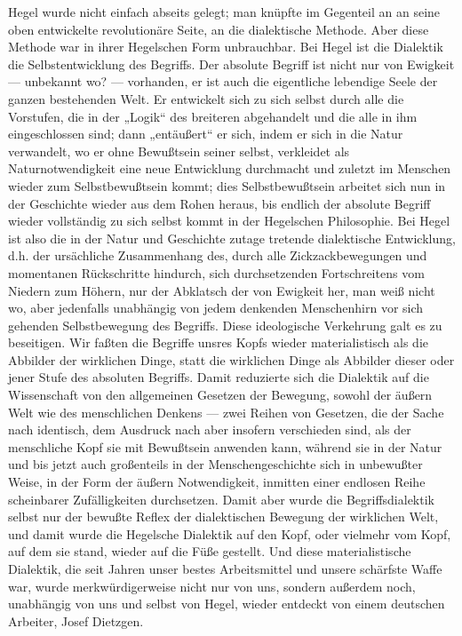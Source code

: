 Hegel wurde nicht einfach abseits gelegt; man knüpfte im
Gegenteil an an seine oben entwickelte revolutionäre Seite, an die
dialektische Methode. Aber diese Methode war in ihrer Hegelschen Form
unbrauchbar. Bei Hegel ist die Dialektik die Selbstentwicklung des
Begriffs. Der absolute Begriff ist nicht nur von Ewigkeit --- unbekannt
wo? --- vorhanden, er ist auch die eigentliche lebendige Seele der ganzen
bestehenden Welt. Er entwickelt sich zu sich selbst durch alle die
Vorstufen, die in der „Logik`` des breiteren abgehandelt und die alle in
ihm eingeschlossen sind; dann „entäußert`` er sich, indem er sich in die
Natur verwandelt, wo er ohne Bewußtsein seiner selbst, verkleidet als
Naturnotwendigkeit eine neue Entwicklung durchmacht und zuletzt im
Menschen wieder zum Selbstbewußtsein kommt; dies Selbstbewußtsein
arbeitet sich nun in der Geschichte wieder aus dem Rohen heraus, bis
endlich der absolute Begriff wieder vollständig zu sich selbst kommt in
der Hegelschen Philosophie. Bei Hegel ist also die in der Natur und
Geschichte zutage tretende dialektische Entwicklung, d.h. der
ursächliche Zusammenhang des, durch alle Zickzackbewegungen und
momentanen Rückschritte hindurch, sich durchsetzenden Fortschreitens vom
Niedern zum Höhern, nur der Abklatsch der von Ewigkeit her, man weiß
nicht wo, aber jedenfalls unabhängig von jedem denkenden Menschenhirn
vor sich gehenden Selbstbewegung des Begriffs. Diese ideologische
Verkehrung galt es zu beseitigen. Wir faßten die Begriffe unsres Kopfs
wieder materialistisch als die
Abbilder der wirklichen Dinge, statt die wirklichen Dinge als Abbilder
dieser oder jener Stufe des absoluten Begriffs. Damit reduzierte sich
die Dialektik auf die Wissenschaft von den allgemeinen Gesetzen der
Bewegung, sowohl der äußern Welt wie des menschlichen Denkens --- zwei
Reihen von Gesetzen, die der Sache nach identisch, dem Ausdruck nach
aber insofern verschieden sind, als der menschliche Kopf sie mit
Bewußtsein anwenden kann, während sie in der Natur und bis jetzt auch
großenteils in der Menschengeschichte sich in unbewußter Weise, in der
Form der äußern Notwendigkeit, inmitten einer endlosen Reihe scheinbarer
Zufälligkeiten durchsetzen. Damit aber wurde die Begriffsdialektik
selbst nur der bewußte Reflex der dialektischen Bewegung der wirklichen
Welt, und damit wurde die Hegelsche Dialektik auf den Kopf, oder
vielmehr vom Kopf, auf dem sie stand, wieder auf die Füße gestellt. Und
diese materialistische Dialektik, die seit Jahren unser bestes
Arbeitsmittel und unsere schärfste Waffe war, wurde merkwürdigerweise
nicht nur von uns, sondern außerdem noch, unabhängig von uns und selbst
von Hegel, wieder entdeckt von einem deutschen Arbeiter, Josef
Dietzgen.

